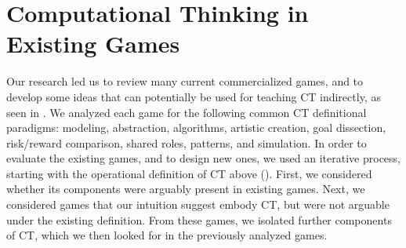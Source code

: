 \documentclass{acm_proc_article-sp}
\begin{document}


\section{Computational Thinking in Existing Games}

Our research led us to review many current commercialized games, and to develop some ideas that can potentially be used for teaching CT indirectly, as seen in {\em \hyperref[table:games-comparison]{}}.
We analyzed each game for the following common CT definitional paradigms: modeling, abstraction, algorithms, artistic creation, goal dissection, risk/reward comparison, shared roles, patterns, and simulation. In order to evaluate the existing games, and to design new ones, we used an iterative process, starting with the operational definition of CT above (\cite{operationalct}). First, we considered whether its components were arguably present in existing games. Next, we considered games that our intuition suggest embody CT, but were not arguable under the existing definition. From these games, we isolated further components of CT, which we then looked for in the previously analyzed games.
\end{document}
